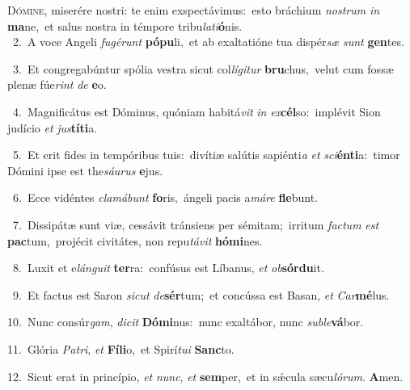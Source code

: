 \lettrine{\initial\textcolor{\initialcolor}{D}}{ómine,} miserére nostri: te enim exspectávimus:~\dagger esto bráchium \textit{nos}\-\textit{trum} \textit{in} \textbf{ma}\-ne,~\star et salus nostra in témpore tribu\-\textit{la}\-\textit{ti}\textbf{ó}nis.\\
{\numbfont\textcolor{\numbcolor}{~2.}}~A voce Angeli \textit{fu}\-\textit{gé}\textit{runt} \textbf{pó}\-\textbf{pu}li,~\star et ab exaltatióne tua dispér\textit{sæ} \textit{sunt} \textbf{gen}\-tes.\par
{\numbfont\textcolor{\numbcolor}{~3.}}~Et congregabúntur spólia vestra sicut col\-\textit{lí}\-\textit{gi}\textit{tur} \textbf{bru}\-chus,~\star velut cum fossæ plenæ fúe\textit{rint} \textit{de} \textbf{e}\-o.\par
{\numbfont\textcolor{\numbcolor}{~4.}}~Magnificátus est Dóminus, quóniam habitá\textit{vit} \textit{in} \textit{ex}\-\textbf{cél}so:~\star implévit Sion judício \textit{et} \textit{jus}\-\textbf{tí}\textbf{ti}a.\par
{\numbfont\textcolor{\numbcolor}{~5.}}~Et erit fides in tempóribus tuis:~\dagger divítiæ salútis sapiénti\textit{a} \textit{et} \textit{sci}\-\textbf{én}\textbf{ti}a:~\star timor Dómini ipse est the\-\textit{sáu}\-\textit{rus} \textbf{e}\-jus.\par
{\numbfont\textcolor{\numbcolor}{~6.}}~Ecce vidéntes \textit{cla}\-\textit{má}\textit{bunt} \textbf{fo}\-ris,~\star ángeli pacis a\-\textit{má}\-\textit{re} \textbf{fle}\-bunt.\par
{\numbfont\textcolor{\numbcolor}{~7.}}~Dissipátæ sunt viæ, cessávit tránsiens per sémitam;~\dagger irritum \textit{fac}\-\textit{tum} \textit{est} \textbf{pac}\-tum,~\star projécit civitátes, non repu\-\textit{tá}\-\textit{vit} \textbf{hó}\-\textbf{mi}nes.\par
{\numbfont\textcolor{\numbcolor}{~8.}}~Luxit et e\-\textit{lán}\-\textit{gu}\textit{it} \textbf{ter}\-ra:~\star confúsus est Líbanus, \textit{et} \textit{ob}\-\textbf{sór}\textbf{du}it.\par
{\numbfont\textcolor{\numbcolor}{~9.}}~Et factus est Saron \textit{sic}\-\textit{ut} \textit{de}\-\textbf{sér}tum;~\star et concússa est Basan, \textit{et} \textit{Car}\-\textbf{mé}lus.\par
{\numbfont\textcolor{\numbcolor}{10.}}~Nunc consúr\-\textit{gam}\-, \textit{di}\-\textit{cit} \textbf{Dó}\-\textbf{mi}nus:~\star nunc exaltábor, nunc \textit{sub}\-\textit{le}\textbf{vá}bor.\par
{\numbfont\textcolor{\numbcolor}{11.}}~Glória \textit{Pa}\-\textit{tri}, \textit{et} \textbf{Fí}\-\textbf{li}o,~\star et Spirí\-\textit{tu}\-\textit{i} \textbf{Sanc}\-to.\par
{\numbfont\textcolor{\numbcolor}{12.}}~Sicut erat in princípio, \textit{et} \textit{nunc}\-, \textit{et} \textbf{sem}\-per,~\star et in sǽcula sæcu\-\textit{ló}\-\textit{rum}. \textbf{A}\-men.\par
